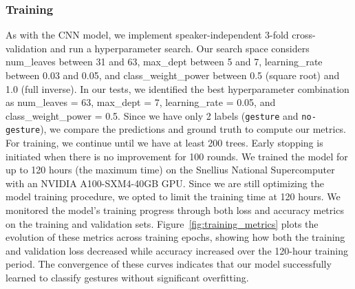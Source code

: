 \documentclass[11pt,smallheadings,cleardoublepage=empty,tocflat,numbers=noenddot,twoside,captions=tableheading]{scrbook}
\begin{document}
\begin{refsection}
\subsubsection{Training}
As with the CNN model, we implement speaker-independent 3-fold cross-validation and run a hyperparameter search. Our search space considers num\_leaves between 31 and 63, max\_dept between 5 and 7, learning\_rate between 0.03 and 0.05, and class\_weight\_power between 0.5 (square root) and 1.0 (full inverse). In our tests, we identified the best hyperparameter combination as num\_leaves = 63, max\_dept = 7, learning\_rate = 0.05, and class\_weight\_power = 0.5. Since we have only 2 labels (\texttt{gesture} and \texttt{no-gesture}), we compare the predictions and ground truth to compute our metrics. For training, we continue until we have at least 200 trees. Early stopping is initiated when there is no improvement for 100 rounds. {\color{blue} We trained the model for up to 120 hours (the maximum time) on the Snellius National Supercomputer with an NVIDIA A100-SXM4-40GB GPU. Since we are still optimizing the model training procedure, we opted to limit the training time at 120 hours.}
We monitored the model's training progress through both loss and accuracy metrics on the training and validation sets. Figure~\ref{fig:training_metrics} plots the evolution of these metrics across training epochs, showing how both the training and validation loss decreased while accuracy increased over the 120-hour training period. The convergence of these curves indicates that our model successfully learned to classify gestures without significant overfitting.


\end{refsection}
\end{document}
